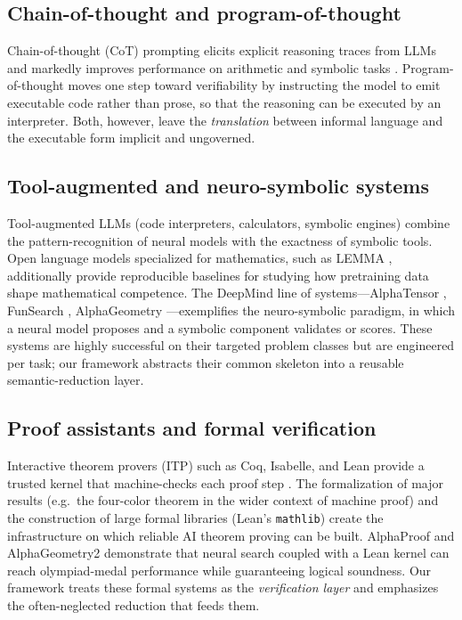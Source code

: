 \documentclass[11pt,a4paper]{article}
\theoremstyle{definition}
\theoremstyle{plain}
\begin{document}
\subsection{Chain-of-thought and program-of-thought}
\label{sec:rel-cot}

Chain-of-thought (CoT) prompting elicits explicit reasoning traces from LLMs and markedly improves
performance on arithmetic and symbolic tasks \cite{wei2022}. Program-of-thought moves one step toward
verifiability by instructing the model to emit executable code rather than prose, so that the reasoning
can be executed by an interpreter. Both, however, leave the \emph{translation} between informal language
and the executable form implicit and ungoverned.

\subsection{Tool-augmented and neuro-symbolic systems}
\label{sec:rel-tools}

Tool-augmented LLMs (code interpreters, calculators, symbolic engines) combine the pattern-recognition
of neural models with the exactness of symbolic tools. Open language models specialized for mathematics,
such as LEMMA \cite{azerbayev2024}, additionally provide reproducible baselines for studying how
pretraining data shape mathematical competence. The DeepMind line of systems---AlphaTensor
\cite{fawzi2022}, FunSearch \cite{romera2024}, AlphaGeometry \cite{trinh2024}---exemplifies the
neuro-symbolic paradigm, in which a neural model proposes and a symbolic component validates or scores.
These systems are highly successful on their targeted problem classes but are engineered per task; our
framework abstracts their common skeleton into a reusable semantic-reduction layer.

\subsection{Proof assistants and formal verification}
\label{sec:rel-formal}

Interactive theorem provers (ITP) such as Coq, Isabelle, and Lean provide a trusted kernel that
machine-checks each proof step \cite{moura2021,polu2020}. The formalization of major results (e.g.\ the
four-color theorem \cite{appel1977} in the wider context of machine proof) and the construction of
large formal libraries (Lean's \texttt{mathlib}) create the infrastructure on which reliable AI theorem
proving can be built. AlphaProof \cite{hubert2026} and AlphaGeometry2 \cite{chervonyi2025} demonstrate
that neural search coupled with a Lean kernel can reach olympiad-medal performance while guaranteeing
logical soundness. Our framework treats these formal systems as the \emph{verification layer} and
emphasizes the often-neglected reduction that feeds them.
\end{document}
